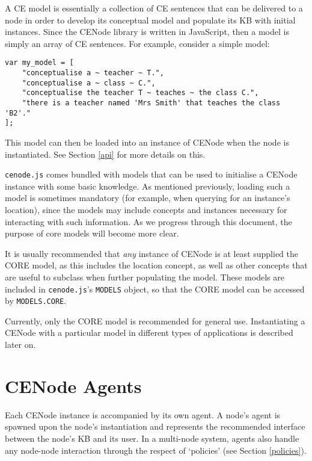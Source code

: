 \documentclass{scrartcl}
\newcommand{\ce}[1]{\textsf{#1}}
\newcommand{\js}[1]{\texttt{#1}}
\begin{document}
A CE model is essentially a collection of CE sentences that can be delivered to a node in order to develop its conceptual model and populate its KB with initial instances. Since the CENode library is written in JavaScript, then a model is simply an array of CE sentences. For example, consider a simple model:

\begin{samepage}
\begin{verbatim}
var my_model = [
    "conceptualise a ~ teacher ~ T.",
    "conceptualise a ~ class ~ C.",
    "conceptualise the teacher T ~ teaches ~ the class C.",
    "there is a teacher named 'Mrs Smith' that teaches the class 'B2'."
];
\end{verbatim}
\end{samepage}

This model can then be loaded into an instance of CENode when the node is instantiated. See Section \ref{api} for more details on this.

\js{cenode.js} comes bundled with models that can be used to initialise a CENode instance with some basic knowledge. As mentioned previously, loading such a model is sometimes mandatory (for example, when querying for an instance's location), since the models may include concepts and instances necessary for interacting with such information. As we progress through this document, the purpose of core models will become more clear.

It is usually recommended that \textit{any} instance of CENode is at least supplied the CORE model, as this includes the \ce{location} concept, as well as other concepts that are useful to subclass when further populating the model. These models are included in \js{cenode.js}'s \js{MODELS} object, so that the CORE model can be accessed by \js{MODELS.CORE}. 

Currently, only the CORE model is recommended for general use. Instantiating a CENode with a particular model in different types of applications is described later on.



\section{CENode Agents}
Each CENode instance is accompanied by its own agent. A node's agent is spawned upon the node's instantiation and represents the recommended interface between the node's KB and its user. In a multi-node system, agents also handle any node-node interaction through the respect of `policies' (see Section \ref{policies}).
\end{document}
